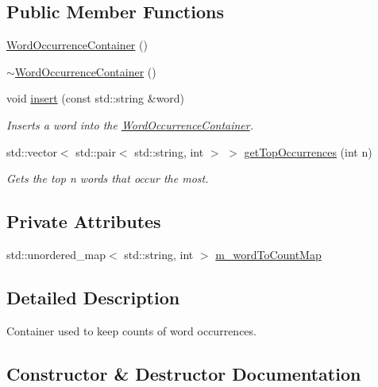 \subsection*{Public Member Functions}
\begin{DoxyCompactItemize}
\item 
\mbox{\hyperlink{class_word_occurrence_container_a777151c21ae2e8d60fbdecb000cd2f44}{Word\+Occurrence\+Container}} ()
\item 
\mbox{\hyperlink{class_word_occurrence_container_a96a671f07750218a9325a8cab89288ef}{$\sim$\+Word\+Occurrence\+Container}} ()
\item 
void \mbox{\hyperlink{class_word_occurrence_container_a3ea24956cdbd599593bd4c0256cf9d15}{insert}} (const std\+::string \&word)
\begin{DoxyCompactList}\small\item\em Inserts a word into the \mbox{\hyperlink{class_word_occurrence_container}{Word\+Occurrence\+Container}}. \end{DoxyCompactList}\item 
std\+::vector$<$ std\+::pair$<$ std\+::string, int $>$ $>$ \mbox{\hyperlink{class_word_occurrence_container_a383cebef200a3e2c12dcf4015381023f}{get\+Top\+Occurrences}} (int n)
\begin{DoxyCompactList}\small\item\em Gets the top n words that occur the most. \end{DoxyCompactList}\end{DoxyCompactItemize}
\subsection*{Private Attributes}
\begin{DoxyCompactItemize}
\item 
std\+::unordered\+\_\+map$<$ std\+::string, int $>$ \mbox{\hyperlink{class_word_occurrence_container_afa4a7302483fae9b9b2025c97101a685}{m\+\_\+word\+To\+Count\+Map}}
\end{DoxyCompactItemize}


\subsection{Detailed Description}
Container used to keep counts of word occurrences. 

\subsection{Constructor \& Destructor Documentation}
\mbox{\label{class_word_occurrence_container_a777151c21ae2e8d60fbdecb000cd2f44}} 

